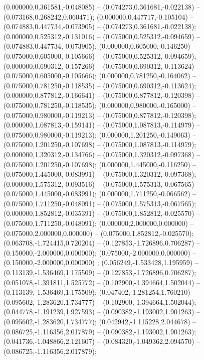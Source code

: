  (0.000000,0.361581,-0.048085) -- (0.074273,0.361681,-0.022138) -- (0.073168,0.268242,0.060471);
 (0.000000,0.447717,-0.105104) -- (0.074883,0.447734,-0.073905) -- (0.074273,0.361681,-0.022138);
 (0.000000,0.525312,-0.131016) -- (0.075000,0.525312,-0.094659) -- (0.074883,0.447734,-0.073905);
 (0.000000,0.605000,-0.146250) -- (0.075000,0.605000,-0.105666) -- (0.075000,0.525312,-0.094659);
 (0.000000,0.690312,-0.157266) -- (0.075000,0.690312,-0.113624) -- (0.075000,0.605000,-0.105666);
 (0.000000,0.781250,-0.164062) -- (0.075000,0.781250,-0.118535) -- (0.075000,0.690312,-0.113624);
 (0.000000,0.877812,-0.166641) -- (0.075000,0.877812,-0.120398) -- (0.075000,0.781250,-0.118535);
 (0.000000,0.980000,-0.165000) -- (0.075000,0.980000,-0.119213) -- (0.075000,0.877812,-0.120398);
 (0.000000,1.087813,-0.159141) -- (0.075000,1.087813,-0.114979) -- (0.075000,0.980000,-0.119213);
 (0.000000,1.201250,-0.149063) -- (0.075000,1.201250,-0.107698) -- (0.075000,1.087813,-0.114979);
 (0.000000,1.320312,-0.134766) -- (0.075000,1.320312,-0.097368) -- (0.075000,1.201250,-0.107698);
 (0.000000,1.445000,-0.116250) -- (0.075000,1.445000,-0.083991) -- (0.075000,1.320312,-0.097368);
 (0.000000,1.575312,-0.093516) -- (0.075000,1.575313,-0.067565) -- (0.075000,1.445000,-0.083991);
 (0.000000,1.711250,-0.066562) -- (0.075000,1.711250,-0.048091) -- (0.075000,1.575313,-0.067565);
 (0.000000,1.852812,-0.035391) -- (0.075000,1.852812,-0.025570) -- (0.075000,1.711250,-0.048091);
 (0.000000,2.000000,0.000000) -- (0.075000,2.000000,0.000000) -- (0.075000,1.852812,-0.025570);
 (0.063708,-1.724415,0.720204) -- (0.127853,-1.726896,0.706287) -- (0.150000,-2.000000,0.000000);
 (0.075000,-2.000000,0.000000) -- (0.150000,-2.000000,0.000000) ;
 (0.056249,-1.533428,1.195959) -- (0.113139,-1.536469,1.175509) -- (0.127853,-1.726896,0.706287);
 (0.051078,-1.391811,1.525772) -- (0.102900,-1.394664,1.502044) -- (0.113139,-1.536469,1.175509);
 (0.047402,-1.281254,1.760210) -- (0.095602,-1.283620,1.734777) -- (0.102900,-1.394664,1.502044);
 (0.044778,-1.191239,1.927593) -- (0.090382,-1.193002,1.901263) -- (0.095602,-1.283620,1.734777);
 (0.042942,-1.115228,2.044678) -- (0.086725,-1.116356,2.017879) -- (0.090382,-1.193002,1.901263);
 (0.041736,-1.048866,2.121607) -- (0.084320,-1.049362,2.094570) -- (0.086725,-1.116356,2.017879);
